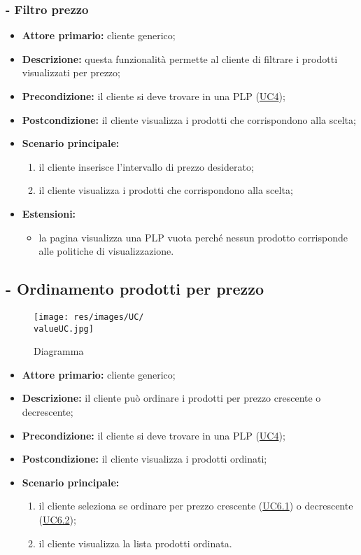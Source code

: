 \stepUserCase
\subsubsection{ - Filtro prezzo}
\begin{itemize}
    \item \textbf{Attore primario:} cliente generico;
    \item \textbf{Descrizione:} questa funzionalità permette al cliente di filtrare i prodotti visualizzati per prezzo;
    \item \textbf{Precondizione:} il cliente si deve trovare in una PLP (\hyperref[UC4]{UC4});
    \item \textbf{Postcondizione:} il cliente visualizza i prodotti che corrispondono alla scelta;
    \item \textbf{Scenario principale:}
          \begin{enumerate}
              \item il cliente inserisce l'intervallo di prezzo desiderato;
              \item il cliente visualizza i prodotti che corrispondono alla scelta;
          \end{enumerate}
    \item \textbf{Estensioni:}
          \begin{itemize}
              \item la pagina visualizza una PLP vuota perché nessun prodotto corrisponde alle politiche di visualizzazione.
          \end{itemize}
\end{itemize}

\stepUserCase
\subsection{ - Ordinamento prodotti per prezzo}
\begin{figure}[H]
    \centering
    \texttt{[image: res/images/UC/\\valueUC.jpg]}
    \caption{Diagramma }
\end{figure}
\begin{itemize}
    \item \textbf{Attore primario:} cliente generico;
    \item \textbf{Descrizione:} il cliente può ordinare i prodotti per prezzo crescente o decrescente;
    \item \textbf{Precondizione:} il cliente si deve trovare in una PLP (\hyperref[UC4]{UC4});
    \item \textbf{Postcondizione:} il cliente visualizza i prodotti ordinati;
    \item \textbf{Scenario principale:}
          \begin{enumerate}
              \item il cliente seleziona se ordinare per prezzo crescente (\hyperref[UC6.1]{UC6.1}) o decrescente (\hyperref[UC6.2]{UC6.2});
              \item il cliente visualizza la lista prodotti ordinata.
          \end{enumerate}
\end{itemize}

